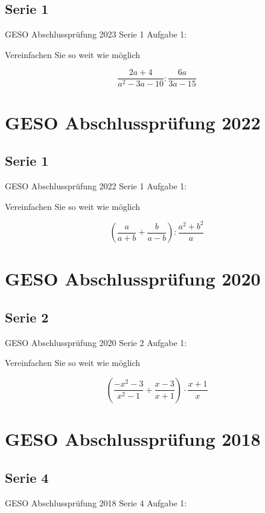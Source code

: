 \subsection*{Serie 1}
GESO Abschlussprüfung 2023 Serie 1 Aufgabe 1:

Vereinfachen Sie so weit wie möglich

$$\frac{2a+4}{a^2-3a-10} : \frac{6a}{3a-15}$$


\section*{GESO Abschlussprüfung 2022}
\subsection*{Serie 1}
GESO Abschlussprüfung 2022 Serie 1 Aufgabe 1:

Vereinfachen Sie so weit wie möglich

$$\left( \frac{a}{a+b} + \frac{b}{a-b} \right) : \frac{a^2+b^2}a$$




\section*{GESO Abschlussprüfung 2020}
\subsection*{Serie 2}
GESO Abschlussprüfung 2020 Serie 2 Aufgabe 1:

Vereinfachen Sie so weit wie möglich

$$\left( \frac{-x^2-3}{x^2-1} + \frac{x-3}{x+1} \right) \cdot{}  \frac{x+1}{x}$$




\section*{GESO Abschlussprüfung 2018}
\subsection*{Serie 4}
GESO Abschlussprüfung 2018 Serie 4 Aufgabe 1:

